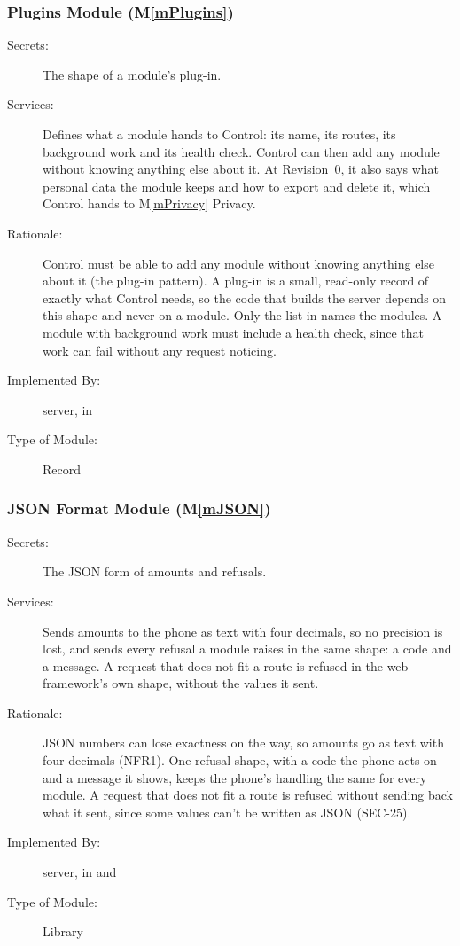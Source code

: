 \documentclass[12pt, titlepage]{article}
\newcommand{\mref}[1]{M\ref{#1}}
\begin{document}
\subsubsection{Plugins Module (\mref{mPlugins})}

\begin{description}
\item[Secrets:] The shape of a module's plug-in.
\item[Services:] Defines what a module hands to Control: its name, its routes, its background work and its health check. Control can then add any module without knowing anything else about it. At Revision~0, it also says what personal data the module keeps and how to export and delete it, which Control hands to \mref{mPrivacy} Privacy.
\item[Rationale:] Control must be able to add any module without knowing anything else about it (the plug-in pattern). A plug-in is a small, read-only record of exactly what Control needs, so the code that builds the server depends on this shape and never on a module. Only the list in  names the modules. A module with background work must include a health check, since that work can fail without any request noticing.
\item[Implemented By:] \progname{} server, in 
\item[Type of Module:] Record
\end{description}

\subsubsection{JSON Format Module (\mref{mJSON})}

\begin{description}
\item[Secrets:] The JSON form of amounts and refusals.
\item[Services:] Sends amounts to the phone as text with four decimals, so no precision is lost, and sends every refusal a module raises in the same shape: a code and a message. A request that does not fit a route is refused in the web framework's own shape, without the values it sent.
\item[Rationale:] JSON numbers can lose exactness on the way, so amounts go as text with four decimals (NFR1). One refusal shape, with a code the phone acts on and a message it shows, keeps the phone's handling the same for every module. A request that does not fit a route is refused without sending back what it sent, since some values can't be written as JSON (SEC-25).
\item[Implemented By:] \progname{} server, in  and 
\item[Type of Module:] Library
\end{description}
\end{document}
